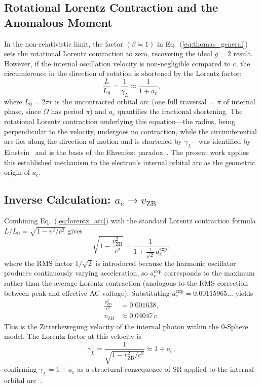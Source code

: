 \documentclass[%
 reprint, amsmath,amssymb, aps, prb, ]{revtex4-2}
\numberwithin{equation}{section}
\newcommand{\vZB}{v_{\text{ZB}}}
\newcommand{\aexp}{a_{e}^{\text{exp}}}
\newcommand{\gammaL}{\gamma_{L}}
\begin{document}
\subsection{\label{sec:lorentz_contraction}Rotational Lorentz Contraction and the Anomalous Moment}

In the non-relativistic limit, the factor $(\beta \fallingdotseq 1)$ in Eq.~(\ref{eq:thomas_general}) sets the rotational Lorentz contraction to zero, recovering the ideal $g = 2$ result. However, if the internal oscillation velocity is non-negligible compared to $c$, the circumference in the direction of rotation is shortened by the Lorentz factor:
\begin{equation}
\frac{L}{L_0} = \frac{1}{\gammaL} \approx \frac{1}{1 + a_e},
\label{eq:lorentz_arc}
\end{equation}
where $L_0 = 2\pi r$ is the uncontracted orbital arc (one full traversal = $\pi$ of internal phase, since $\Omega$ has period $\pi$) and $a_e$ quantifies the fractional shortening. The rotational Lorentz contraction underlying this equation---the radius, being perpendicular to the velocity, undergoes no contraction, while the circumferential arc lies along the direction of motion and is shortened by $\gammaL$---was identified by Einstein~\cite{Einstein1912} and is the basis of the Ehrenfest paradox~\cite{Ehrenfest1909}. The present work applies this established mechanism to the electron's internal orbital arc as the geometric origin of $a_e$.

\subsection{\label{sec:inverse}Inverse Calculation: $a_e \to \vZB$}

Combining Eq.~(\ref{eq:lorentz_arc}) with the standard Lorentz contraction formula $L/L_0 = \sqrt{1 - v^2/c^2}$ gives~\cite{Hanamura_2023_10,Hanamura_2025_14}
\begin{equation}
\sqrt{1 - \frac{\vZB^2}{c^2}} = \frac{1}{1 + \tfrac{1}{\sqrt{2}}\,\aexp},
\label{eq:inverse_rms}
\end{equation}
where the RMS factor $1/\sqrt{2}$ is introduced because the harmonic oscillator produces continuously varying acceleration, so $\aexp$ corresponds to the maximum rather than the average Lorentz contraction (analogous to the RMS correction between peak and effective AC voltage). Substituting $\aexp = 0.00115965\ldots$ yields
\begin{align}
\frac{\vZB^2}{c^2} &= 0.001638, \label{eq:beta_sq} \\
\vZB &\approx 0.04047\,c. \label{eq:v_ZB_result}
\end{align}
This is the Zitterbewegung velocity of the internal photon within the 0-Sphere model. The Lorentz factor at this velocity is
\begin{equation}
\gammaL = \frac{1}{\sqrt{1 - \vZB^2/c^2}} \approx 1 + a_e,
\label{eq:gamma_result}
\end{equation}
confirming $\gammaL = 1 + a_e$ as a structural consequence of SR applied to the internal orbital arc~\cite{Hanamura_2025_14,Hanamura_2025_15}.
\end{document}
